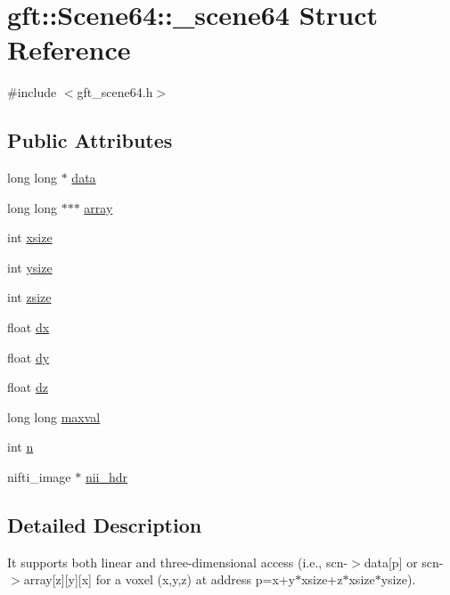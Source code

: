 \hypertarget{structgft_1_1Scene64_1_1__scene64}{}\section{gft\+:\+:Scene64\+:\+:\+\_\+scene64 Struct Reference}
\label{structgft_1_1Scene64_1_1__scene64}


{\ttfamily \#include $<$gft\+\_\+scene64.\+h$>$}

\subsection*{Public Attributes}
\begin{DoxyCompactItemize}
\item 
long long $\ast$ \hyperlink{structgft_1_1Scene64_1_1__scene64_adec35bd86b2f51dd54fbff35d8a560c4}{data}
\item 
long long $\ast$$\ast$$\ast$ \hyperlink{structgft_1_1Scene64_1_1__scene64_aed0e82cb82951a0713f9c4f9fd0bb149}{array}
\item 
int \hyperlink{structgft_1_1Scene64_1_1__scene64_a0f0f916d2e52851d8ac7858d57a2ed45}{xsize}
\item 
int \hyperlink{structgft_1_1Scene64_1_1__scene64_a22520a503f545c3f354dec3615b14412}{ysize}
\item 
int \hyperlink{structgft_1_1Scene64_1_1__scene64_a66b1037cc070c44c1ba09ac8189c46b3}{zsize}
\item 
float \hyperlink{structgft_1_1Scene64_1_1__scene64_a5ff7145581eaa98a4864b98c7ea82628}{dx}
\item 
float \hyperlink{structgft_1_1Scene64_1_1__scene64_a81df9540cea73dc5f5dcd6dc89576126}{dy}
\item 
float \hyperlink{structgft_1_1Scene64_1_1__scene64_a08029a857fd94b49bf8dc5ef1095ca7e}{dz}
\item 
long long \hyperlink{structgft_1_1Scene64_1_1__scene64_af8b33eb6141586f7f7bed68679d9c7d1}{maxval}
\item 
int \hyperlink{structgft_1_1Scene64_1_1__scene64_ad720e068eb0feb0668cae62d6716797f}{n}
\item 
nifti\+\_\+image $\ast$ \hyperlink{structgft_1_1Scene64_1_1__scene64_a5013d9032f0d01655c65e55518d72786}{nii\+\_\+hdr}
\end{DoxyCompactItemize}


\subsection{Detailed Description}
It supports both linear and three-\/dimensional access (i.\+e., scn-\/$>$data\mbox{[}p\mbox{]} or scn-\/$>$array\mbox{[}z\mbox{]}\mbox{[}y\mbox{]}\mbox{[}x\mbox{]} for a voxel (x,y,z) at address p=x+y$\ast$xsize+z$\ast$xsize$\ast$ysize). 

